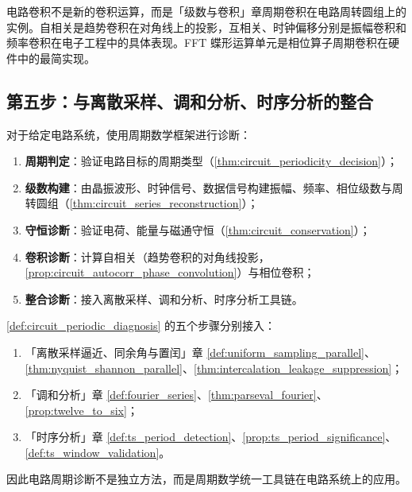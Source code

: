 \begin{remark}[电路卷积与周期卷积的关系]\label{rem:circuit_convolution_relation}
电路卷积不是新的卷积运算，而是「级数与卷积」章周期卷积在电路周转圆组上的实例。自相关是趋势卷积在对角线上的投影，互相关、时钟偏移分别是振幅卷积和频率卷积在电子工程中的具体表现。FFT 蝶形运算单元是相位算子周期卷积在硬件中的最简实现。
\end{remark}

\subsection{第五步：与离散采样、调和分析、时序分析的整合}

\begin{definition}[电路周期诊断流程]\label{def:circuit_periodic_diagnosis}
对于给定电路系统，使用周期数学框架进行诊断：
\begin{enumerate}[label=(\roman*)]
    \item \textbf{周期判定}：验证电路目标的周期类型（\cref{thm:circuit_periodicity_decision}）；
    \item \textbf{级数构建}：由晶振波形、时钟信号、数据信号构建振幅、频率、相位级数与周转圆组（\cref{thm:circuit_series_reconstruction}）；
    \item \textbf{守恒诊断}：验证电荷、能量与磁通守恒（\cref{thm:circuit_conservation}）；
    \item \textbf{卷积诊断}：计算自相关（趋势卷积的对角线投影，\cref{prop:circuit_autocorr_phase_convolution}）与相位卷积；
    \item \textbf{整合诊断}：接入离散采样、调和分析、时序分析工具链。
\end{enumerate}
\end{definition}

\begin{theorem}[电路周期诊断流程与三章接口]\label{thm:circuit_diagnosis_integration}
\cref{def:circuit_periodic_diagnosis} 的五个步骤分别接入：
\begin{enumerate}[label=(\roman*)]
    \item 「离散采样逼近、同余角与置闰」章 \cref{def:uniform_sampling_parallel}、\cref{thm:nyquist_shannon_parallel}、\cref{thm:intercalation_leakage_suppression}；
    \item 「调和分析」章 \cref{def:fourier_series}、\cref{thm:parseval_fourier}、\cref{prop:twelve_to_six}；
    \item 「时序分析」章 \cref{def:ts_period_detection}、\cref{prop:ts_period_significance}、\cref{def:ts_window_validation}。
\end{enumerate}
因此电路周期诊断不是独立方法，而是周期数学统一工具链在电路系统上的应用。
\end{theorem}

